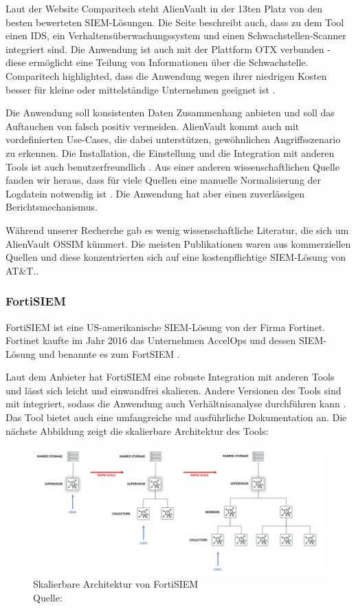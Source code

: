 Laut der Website Comparitech steht AlienVault in der 13ten Platz von den besten bewerteten \gls{SIEM}-Lösungen. Die Seite beschreibt auch, dass zu dem Tool einen \gls{IDS}, ein Verhaltensüberwachungssystem und einen Schwachstellen-Scanner integriert sind. Die Anwendung ist auch mit der Plattform \gls{OTX} verbunden - diese ermöglicht eine Teilung von Informationen über die Schwachstelle. Comparitech highlighted, dass die Anwendung wegen ihrer niedrigen Kosten besser für kleine oder mittelständige Unternehmen geeignet ist \citep{comparitech_SIEM}. 

Die Anwendung soll konsistenten Daten Zusammenhang anbieten und soll das Auftauchen von \gls{falsch positiv} vermeiden. AlienVault kommt auch mit vordefinierten Use-Cases, die dabei unterstützen, gewöhnlichen Angriffsszenario zu erkennen. Die Installation, die Einstellung und die Integration mit anderen Tools ist auch benutzerfreundlich \citep{Gomes_AV}. Aus einer anderen wissenschaftlichen Quelle fanden wir heraus, dass für viele Quellen eine manuelle Normalisierung der Logdatein notwendig ist \citep{Nabil_AV}. Die Anwendung hat aber einen zuverlässigen Berichtsmechanismus. 

Während unserer Recherche gab es wenig wissenschaftliche Literatur, die sich um AlienVault OSSIM kümmert. Die meisten Publikationen waren aus kommerziellen Quellen und diese konzentrierten sich auf eine kostenpflichtige \gls{SIEM}-Lösung von AT\&T..

\subsubsection{FortiSIEM}
FortiSIEM ist eine US-amerikanische \gls{SIEM}-Lösung von der Firma Fortinet. Fortinet kaufte im Jahr 2016 das Unternehmen AccelOps und dessen \gls{SIEM}-Lösung und benannte es zum FortSIEM \citep{Fortinet_Press}. 

Laut dem Anbieter hat FortiSIEM eine robuste Integration mit anderen Tools und lässt sich leicht und einwandfrei skalieren. Andere Versionen des Tools sind mit  integriert, sodass die Anwendung auch Verhältnisanalyse durchführen kann \citep{Fortinet_Solutions}. Das Tool bietet auch eine umfangreiche und ausführliche Dokumentation an. Die nächste Abbildung zeigt die skalierbare Architektur des Tools:

\begin{figure}[H]
   \centering
   \includegraphics[width=1\textwidth]{assets/2_p7.png}
   \caption{Skalierbare Architektur von FortiSIEM \\Quelle: \citep{Fortinet_Arch} }
   \centering
\end{figure}

